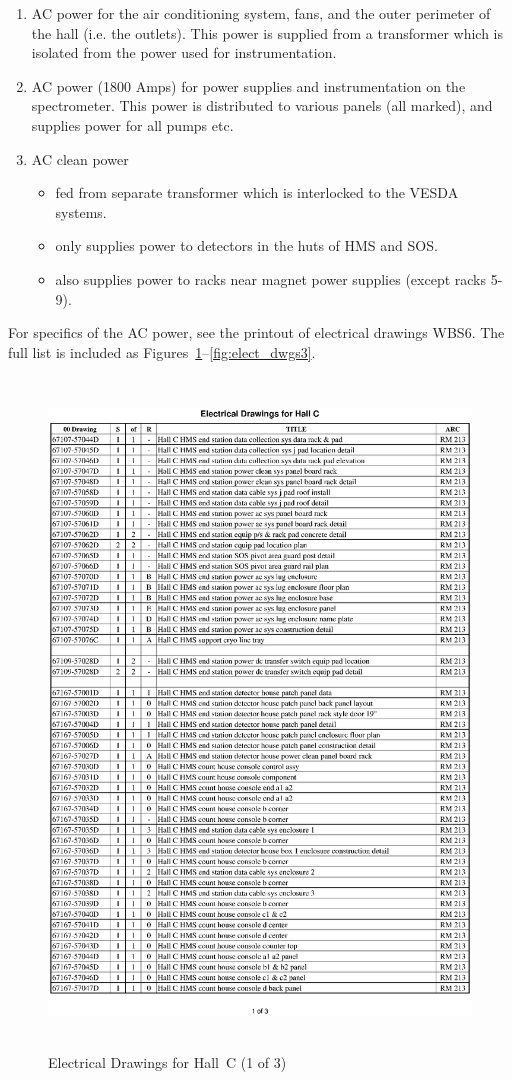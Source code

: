 \begin{enumerate}
\item{AC power for the air conditioning system, fans, and the
outer perimeter of the hall (i.e. the outlets). This power is
supplied from a transformer which is isolated from the power
used for instrumentation.}
\item{AC power (1800 Amps) for power supplies and instrumentation
on the spectrometer. This power is distributed to various panels
(all marked), and supplies power for all pumps etc.}
\item{AC clean power
\begin{itemize}
\item{fed from separate transformer which is interlocked to the
VESDA systems.}
\item{only supplies power to detectors in the huts of HMS and SOS.}
\item{also supplies power to racks near magnet power supplies (except
racks 5-9).}
\end{itemize}}
\end{enumerate}

For specifics of the AC power, see the printout of electrical drawings
WBS6. The full list is included as  Figures~\ref{fig:elect_dwgs1}--\ref{fig:elect_dwgs3}.
\clearpage
\begin{figure}
\begin{center}
\includegraphics[height=7in]{ele1p.ps}
\caption{Electrical Drawings for Hall~C (1 of 3)}
\label{fig:elect_dwgs1}
\end{center}
\end{figure}

